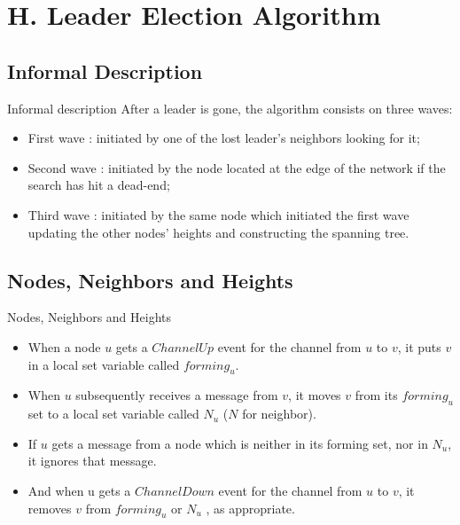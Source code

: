 \documentclass{beamer}
\begin{document}
\section{H. Leader Election Algorithm}
\subsection{Informal Description}
\begin{frame}{Informal description}
After a leader is gone, the algorithm consists on three waves:
\begin{itemize}
	\item First wave : initiated by one of the lost leader's neighbors looking for it;
	\item Second wave : initiated by the node located at the edge of the network if the search has hit a dead-end;
	\item Third wave : initiated by the same node which initiated the first wave updating the other nodes' heights and constructing the spanning tree.
\end{itemize}

\end{frame}

\subsection{Nodes, Neighbors and Heights}

\begin{frame}{Nodes, Neighbors and Heights}
\begin{itemize}
	\item When a node $u$ gets a $ChannelUp$ event for the channel from $u$ to $v$, it puts $v$ in a local set variable called $forming_u$.
	\item When $u$ subsequently receives a message from $v$, it moves $v$ from its $forming_u$ set to a local set variable called $N_u$ ($N$ for neighbor).
	\item If $u$ gets a message from a node which is neither in its forming set, nor in $N_u$, it ignores that message.
	\item And when u gets a $ChannelDown$ event for the channel from $u$ to $v$, it removes $v$ from $forming_u$ or $N_u$ , as appropriate. 
\end{itemize}
\end{frame}
\end{document}
